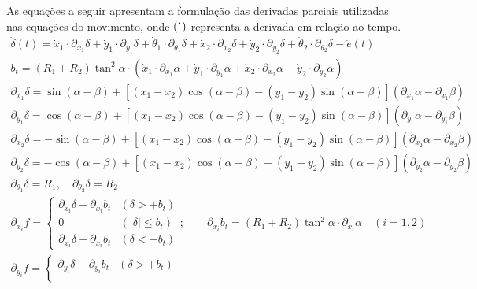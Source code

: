 As equações a seguir apresentam a formulação das derivadas parciais utilizadas nas equações do movimento, onde $(\hspace{2px} \dot{} \hspace{2px})$ representa a derivada em relação ao tempo.
\begin{gather*}
	\dot{\delta}(t) = \dot{x}_1 \cdot \partial_{x_1}\delta + \dot{y}_1 \cdot \partial_{y_1}\delta + \dot{\theta}_1 \cdot \partial_{\theta_1}\delta + \dot{x}_2 \cdot \partial_{x_2}\delta + \dot{y}_2 \cdot \partial_{y_2}\delta + \dot{\theta}_2 \cdot \partial_{\theta_2}\delta - \dot{e}(t)
\\
	\dot{b}_t = (R_1 + R_2) \tan^2 \alpha \cdot (\dot{x}_1 \cdot \partial_{x_1}\alpha + \dot{y}_1 \cdot \partial_{y_1}\alpha + \dot{x}_2 \cdot \partial_{x_2}\alpha + \dot{y}_2 \cdot \partial_{y_2}\alpha)
\\
	\partial_{x_1}\delta = \sin(\alpha - \beta) + [(x_1 - x_2) \cos(\alpha - \beta) - (y_1 - y_2) \sin(\alpha - \beta)](\partial_{x_1}\alpha - \partial_{x_1}\beta)
\\
	\partial_{y_1}\delta = \cos(\alpha - \beta) + [(x_1 - x_2) \cos(\alpha - \beta) - (y_1 - y_2) \sin(\alpha - \beta)](\partial_{y_1}\alpha - \partial_{y_1}\beta)
\\
	\partial_{x_2}\delta = -\sin(\alpha - \beta) + [(x_1 - x_2) \cos(\alpha - \beta) - (y_1 - y_2) \sin(\alpha - \beta)](\partial_{x_2}\alpha - \partial_{x_2}\beta)
\\
	\partial_{y_2}\delta = -\cos(\alpha - \beta) + [(x_1 - x_2) \cos(\alpha - \beta) - (y_1 - y_2) \sin(\alpha - \beta)](\partial_{y_2}\alpha - \partial_{y_2}\beta)
\\
	\partial_{\theta_1}\delta = R_1, \quad \partial_{\theta_2}\delta = R_2
\\
	\partial_{x_i}f = \begin{cases} 
		\partial_{x_i}\delta - \partial_{x_i}b_t & (\delta > +b_t) \\
		0 & (|\delta| \le b_t) \\
		\partial_{x_i}\delta + \partial_{x_i}b_t & (\delta < -b_t)
	\end{cases} ; \qquad \partial_{x_i}b_t = (R_1 + R_2) \tan^2 \alpha \cdot \partial_{x_i}\alpha \quad (i = 1, 2)
\\[0.7em]
	\partial_{y_i}f = \begin{cases} 
		\partial_{y_i}\delta - \partial_{y_i}b_t & (\delta > +b_t) \\

\end{cases}
\end{gather*}
